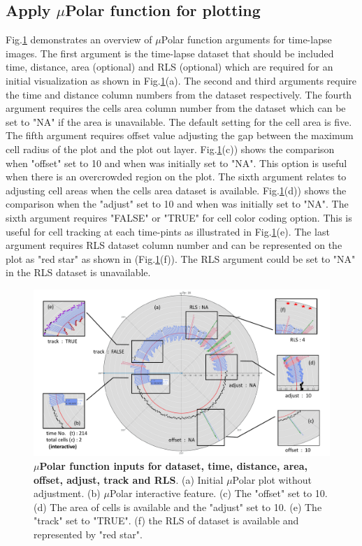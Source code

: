 \documentclass[conference]{IEEEtran}
\begin{document}
\subsection{Apply $\mu$Polar function for plotting}

Fig.\ref{fig:label} demonstrates an overview of $\mu$Polar function arguments for time-lapse images. The first argument is the time-lapse dataset that should be included time, distance, area (optional) and RLS (optional) which are required for an initial visualization as shown in Fig.\ref{fig:label}(a). The second and third arguments require the time and distance column numbers from the dataset respectively. The fourth argument requires the cells area column number from the dataset which can be set to "NA" if the area is unavailable. The default setting for the cell area is five. The fifth argument requires offset value adjusting the gap between the maximum cell radius of the plot and the plot out layer. Fig.\ref{fig:label}(c)) shows the comparison when "offset" set to 10 and when was initially set to "NA". This option is useful when there is an overcrowded region on the plot. The sixth argument relates to adjusting cell areas when the cells area dataset is available. Fig.\ref{fig:label}(d)) shows the comparison when the "adjust" set to 10 and when was initially set to "NA". The sixth argument requires "FALSE" or "TRUE" for cell color coding option. This is useful for cell tracking at each time-pints as illustrated in Fig.\ref{fig:label}(e). The last argument requires RLS dataset column number and can be represented on the plot as "red star" as shown in (Fig.\ref{fig:label}(f)). The RLS argument could be set to "NA" in the RLS dataset is unavailable.


\begin{figure}
\centering
\includegraphics[width=\textwidth,height=10 cm]{Patterns/option.pdf}
\caption{ \textbf{ $\mu$Polar function inputs for dataset, time, distance, area, offset, adjust, track and RLS}. (a) Initial $\mu$Polar plot without adjustment. (b) $\mu$Polar interactive feature. (c) The "offset" set to 10. (d) The area of cells is available and the "adjust" set to 10. (e) The "track" set to "TRUE". (f) the RLS of dataset is available and represented by "red star".}
\label{fig:label}
\end{figure}
\end{document}
